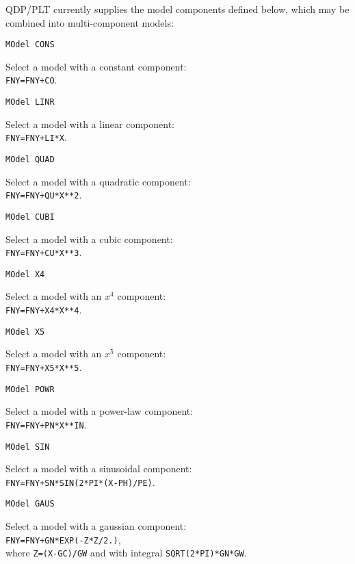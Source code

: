 QDP/PLT currently supplies the model components defined below, which
may be combined into multi-component models:

\medskip\begin{verbatim}
MOdel CONS
\end{verbatim}
Select a model with a constant component:\\
{\tt FNY=FNY+CO}.

\medskip\begin{verbatim}
MOdel LINR
\end{verbatim}
Select a model with a linear component:\\
{\tt FNY=FNY+LI*X}.

\medskip\begin{verbatim}
MOdel QUAD
\end{verbatim}
Select a model with a quadratic component:\\
{\tt FNY=FNY+QU*X**2}.

\medskip\begin{verbatim}
MOdel CUBI
\end{verbatim}
Select a model with a cubic component:\\
{\tt FNY=FNY+CU*X**3}.

\medskip\begin{verbatim}
MOdel X4
\end{verbatim}
Select a model with an $x^4$ component:\\
{\tt FNY=FNY+X4*X**4}.

\medskip\begin{verbatim}
MOdel X5
\end{verbatim}
Select a model with an $x^5$ component:\\
{\tt FNY=FNY+X5*X**5}.

\medskip\begin{verbatim}
MOdel POWR
\end{verbatim}
Select a model with a power-law component:\\
{\tt FNY=FNY+PN*X**IN}.

\medskip\begin{verbatim}
MOdel SIN
\end{verbatim}
Select a model with a sinusoidal component:\\
{\tt FNY=FNY+SN*SIN(2*PI*(X-PH)/PE)}.

\medskip\begin{verbatim}
MOdel GAUS
\end{verbatim}
Select a model with a gaussian component:\\
{\tt FNY=FNY+GN*EXP(-Z*Z/2.)},\\
where {\tt Z=(X-GC)/GW} and with integral {\tt SQRT(2*PI)*GN*GW}.

